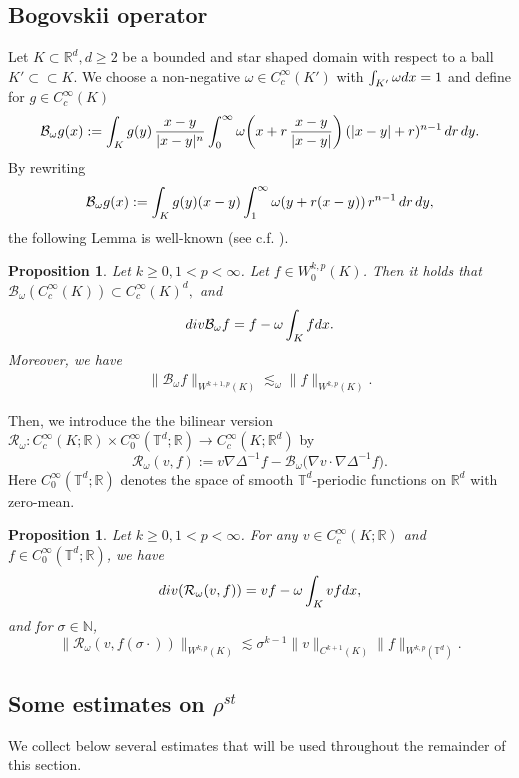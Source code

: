 \documentclass[10pt,a4paper]{amsart}
\numberwithin{equation}{section}
\newtheorem{proposition}[theorem]{Proposition}
\def\({{\Big(}}
\def\){{\Big)}}
\def\dif{{\mathord{{\rm d}}}}
\def\mT{{\mathbb T}}
\def\geq{\geqslant}
\def\div{\mathord{{\rm div}}}
\def\({{\Big(}}
\def\){{\Big)}}
\def\dif{{\mathord{{\rm d}}}}
\def\bp{\begin{proposition}}
\def\ep{\end{proposition}}
\def\geq{\geqslant}
\def\div{\mathord{{\rm div}}}
\begin{document}
 \subsection{Bogovskii operator}\label{R:tamr}
 Let $K\subset \mathbb{R}^d,d\geq2$ be a bounded and star shaped domain with respect to a ball $K'\subset\subset K$.
We choose a non-negative $\omega \in C_c^\infty(K')$ with $\int_{K'} \omega\dif x = 1$ and define for
$g\in C_c^\infty(K)$
\begin{equation}
    \mathcal{B}_\omega g(x) := \int_{K} g(y)\,\frac{x - y}{\lvert x - y \rvert^{n}}
    \int_{0}^{\infty} \omega\!\left(x + r\,\frac{x - y}{\lvert x - y \rvert}\right)
      (|x-y|+r)^{n-1}\,\dif r\,\dif y.\notag
\end{equation}
By rewriting 
\begin{equation}
    \mathcal{B}_\omega g(x) :=\int_{K} g(y)(x - y) 
    \int_{1}^{\infty} \omega\!\left(y + r(x - y) \right)
      r^{n-1}\,\dif r\,\dif y,\notag
\end{equation}
  the following Lemma is well-known (see c.f. \cite[Theorem 1]{Bog79}).
\bp  Let $k\geq0,1 <p< \infty$. Let $f \in W_0^{k,p}(K)$. Then it holds that $ \mathcal{B}_\omega( C_c^\infty(K)) \subset C_c^\infty(K)^d,$ and 
\begin{align*}
    \div \mathcal{B}_\omega f=f-\omega\int_{K}f\dif x.
\end{align*}
Moreover, we have
\begin{align*}
    \|\mathcal{B}_\omega f\|_{W^{k+1,p}(K)}\lesssim_{\omega} \|f\|_{W^{k,p}(K)}.
\end{align*}

\ep
Then, we introduce the the bilinear version $\mathcal{R}_\omega: C^\infty_c(K; \mathbb{R}) \times C_0^\infty(\mathbb{T}^d; \mathbb{R})\to C_c^\infty(K; \mathbb{R}^{d})$  by $$\mathcal{R}_\omega(v,f):=v\nabla\Delta^{-1}f-\mathcal{B}_\omega\(\nabla v\cdot\nabla\Delta^{-1}f\).$$
Here $C^\infty_0(\mathbb{T}^d;\mathbb{R})$ denotes the space of smooth $\mathbb{T}^d$-periodic functions on $\mathbb{R}^d$ with zero-mean.

\bp \label{R:bb1_1}
Let $k\geq 0,1 < p <\infty$. For any $v \in C^\infty_c(K; \mathbb{R})$ and  $f\in C_0^\infty(\mathbb{T}^d; \mathbb{R})$, we have $$\div(\mathcal{R}_\omega(v,f))=vf-\omega\int_{K}vf\dif x,$$ and for  $\sigma\in\mathbb{N}$,
$$\|\mathcal{R}_\omega(v,f(\sigma\cdot))\|_{W^{k,p}(K)}\lesssim\sigma^{k-1}\|v\|_{C^{k+1}(K)}\|f\|_{W^{k,p}(\mT^d)}.$$
\ep 

 

\subsection{Some estimates on $\rho^{st}$}
We collect below several estimates that will be used throughout the remainder of this section.
\end{document}
